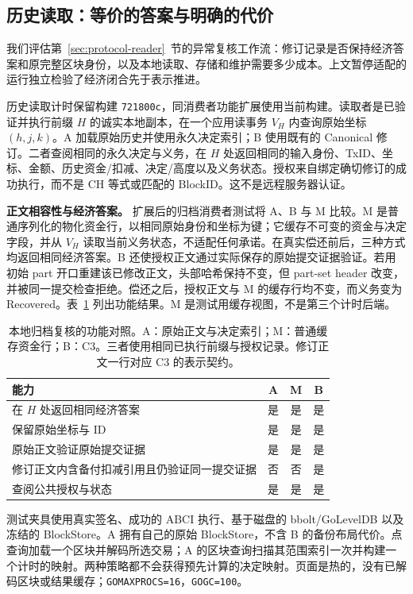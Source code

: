 \subsection{历史读取：等价的答案与明确的代价}
\label{sec:eval-reader}

我们评估第~\ref{sec:protocol-reader}~节的异常复核工作流：修订记录是否保持经济答案和原完整区块身份，以及本地读取、存储和维护需要多少成本。上文暂停适配的运行独立检验了经济闭合先于表示推进。

历史读取计时保留构建 \texttt{721800c}，同消费者功能扩展使用当前构建。读取者是已验证并执行前缀 $H$ 的诚实本地副本，在一个应用读事务 $V_H$ 内查询原始坐标 $(h,j,k)$。A 加载原始历史并使用永久决定索引；B 使用既有的 Canonical 修订。二者查阅相同的永久决定与义务，在 $H$ 处返回相同的输入身份、TxID、坐标、金额、历史资金/扣减、决定/高度以及义务状态。授权来自绑定确切修订的成功执行，而不是 CH 等式或匹配的 BlockID。这不是远程服务器认证。


\noindent\textbf{正文相容性与经济答案。}
扩展后的归档消费者测试将 A、B 与 M 比较。M 是普通序列化的物化资金行，以相同原始身份和坐标为键；它缓存不可变的资金与决定字段，并从 $V_H$ 读取当前义务状态，不适配任何承诺。在真实偿还前后，三种方式均返回相同经济答案。B 还使授权正文通过实际保存的原始提交证据验证。若用初始 part 开口重建该已修改正文，头部哈希保持不变，但 part-set header 改变，并被同一提交检查拒绝。偿还之后，授权正文与 M 的缓存行均不变，而义务变为 Recovered。表~\ref{tab:c3-function} 列出功能结果。M 是测试用缓存视图，不是第三个计时后端。

\begin{table}[t]
  \centering
  \caption{本地归档复核的功能对照。A：原始正文与决定索引；M：普通缓存资金行；B：C3。三者使用相同已执行前缀与授权记录。修订正文一行对应 C3 的表示契约。}
  \label{tab:c3-function}
  \small
  \begin{tabular}{@{}p{}ccc@{}}
    \toprule
    能力 & A & M & B \\
    \midrule
    在 $H$ 处返回相同经济答案 & 是 & 是 & 是 \\
    保留原始坐标与 ID & 是 & 是 & 是 \\
    原始正文验证原始提交证据 & 是 & 是 & 是 \\
    修订正文内含备付扣减引用且仍验证同一提交证据 & 否 & 否 & 是 \\
    查阅公共授权与状态 & 是 & 是 & 是 \\
    \bottomrule
  \end{tabular}
\end{table}

测试夹具使用真实签名、成功的 ABCI 执行、基于磁盘的 bbolt/GoLevelDB 以及冻结的 BlockStore。A 拥有自己的原始 BlockStore，不含 B 的备份布局代价。点查询加载一个区块并解码所选交易；A 的区块查询扫描其范围索引一次并构建一个计时的映射。两种策略都不会获得预先计算的决定映射。页面是热的，没有已解码区块或结果缓存；\texttt{GOMAXPROCS=16}，\texttt{GOGC=100}。

